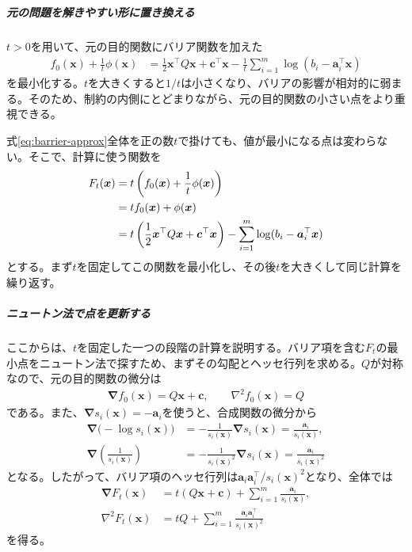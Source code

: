 \documentclass[a4j]{jarticle}
\begin{document}
\subparagraph{元の問題を解きやすい形に置き換える}
$t>0$を用いて、元の目的関数にバリア関数を加えた
\begin{align}
  f_0(\bm{x})+\frac1t\phi(\bm{x})
  &=\frac12\bm{x}^\top Q\bm{x}+\bm{c}^\top \bm{x}
    -\frac1t\sum_{i=1}^{m}\log(b_i-\bm{a}_i^\top \bm{x})
  \label{eq:barrier-approx}
\end{align}
を最小化する。$t$を大きくすると$1/t$は小さくなり、バリアの影響が相対的に弱まる。そのため、制約の内側にとどまりながら、元の目的関数の小さい点をより重視できる。

式\eqref{eq:barrier-approx}全体を正の数$t$で掛けても、値が最小になる点は変わらない。そこで、計算に使う関数を
\begin{align}
  F_t(\bm{x})
  &=t\left(f_0(\bm{x})+\frac1t\phi(\bm{x})\right)\notag\\
  &=t f_0(\bm{x})+\phi(\bm{x})\notag\\
  &=t\left(\frac12\bm{x}^\top Q\bm{x}+\bm{c}^\top \bm{x}\right)
    -\sum_{i=1}^{m}\log(b_i-\bm{a}_i^\top \bm{x})
  \label{eq:barrier}
\end{align}
とする。まず$t$を固定してこの関数を最小化し、その後$t$を大きくして同じ計算を繰り返す。

\subparagraph{ニュートン法で点を更新する}
ここからは、$t$を固定した一つの段階の計算を説明する。バリア項を含む$F_t$の最小点をニュートン法で探すため、まずその勾配とヘッセ行列を求める。$Q$が対称なので、元の目的関数の微分は
\begin{align}
  \bm{\nabla} f_0(\bm{x})=Q\bm{x}+\bm{c},\qquad \nabla^2f_0(\bm{x})=Q
\end{align}
である。また、$\bm{\nabla} s_i(\bm{x})=-\bm{a}_i$を使うと、合成関数の微分から
\begin{align}
  \bm{\nabla}\bigl(-\log s_i(\bm{x})\bigr)
  &=-\frac1{s_i(\bm{x})}\bm{\nabla} s_i(\bm{x})
    =\frac{\bm{a}_i}{s_i(\bm{x})},\\
  \bm{\nabla}\left(\frac1{s_i(\bm{x})}\right)
  &=-\frac1{s_i(\bm{x})^2}\bm{\nabla} s_i(\bm{x})
    =\frac{\bm{a}_i}{s_i(\bm{x})^2}
\end{align}
となる。したがって、バリア項のヘッセ行列は$\bm{a}_i \bm{a}_i^\top/s_i(\bm{x})^2$となり、全体では
\begin{align}
  \bm{\nabla} F_t(\bm{x})&=t(Q\bm{x}+\bm{c})+\sum_{i=1}^{m}\frac{\bm{a}_i}{s_i(\bm{x})},\\
  \nabla^2 F_t(\bm{x})&=tQ+\sum_{i=1}^{m}\frac{\bm{a}_i \bm{a}_i^\top}{s_i(\bm{x})^2}
  \label{eq:barrier-derivatives}
\end{align}
を得る。
\end{document}
